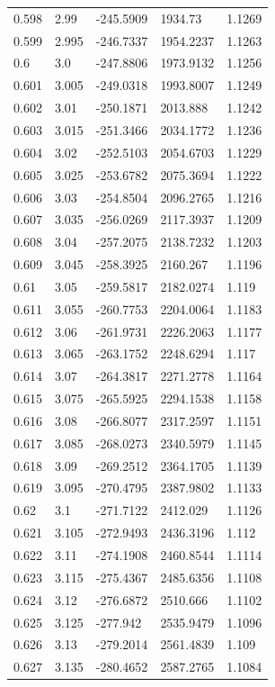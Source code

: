\begin{tabular}{lllll}
0.598 & 2.99 & -245.5909 & 1934.73 & 1.1269 \\
0.599 & 2.995 & -246.7337 & 1954.2237 & 1.1263 \\
0.6 & 3.0 & -247.8806 & 1973.9132 & 1.1256 \\
0.601 & 3.005 & -249.0318 & 1993.8007 & 1.1249 \\
0.602 & 3.01 & -250.1871 & 2013.888 & 1.1242 \\
0.603 & 3.015 & -251.3466 & 2034.1772 & 1.1236 \\
0.604 & 3.02 & -252.5103 & 2054.6703 & 1.1229 \\
0.605 & 3.025 & -253.6782 & 2075.3694 & 1.1222 \\
0.606 & 3.03 & -254.8504 & 2096.2765 & 1.1216 \\
0.607 & 3.035 & -256.0269 & 2117.3937 & 1.1209 \\
0.608 & 3.04 & -257.2075 & 2138.7232 & 1.1203 \\
0.609 & 3.045 & -258.3925 & 2160.267 & 1.1196 \\
0.61 & 3.05 & -259.5817 & 2182.0274 & 1.119 \\
0.611 & 3.055 & -260.7753 & 2204.0064 & 1.1183 \\
0.612 & 3.06 & -261.9731 & 2226.2063 & 1.1177 \\
0.613 & 3.065 & -263.1752 & 2248.6294 & 1.117 \\
0.614 & 3.07 & -264.3817 & 2271.2778 & 1.1164 \\
0.615 & 3.075 & -265.5925 & 2294.1538 & 1.1158 \\
0.616 & 3.08 & -266.8077 & 2317.2597 & 1.1151 \\
0.617 & 3.085 & -268.0273 & 2340.5979 & 1.1145 \\
0.618 & 3.09 & -269.2512 & 2364.1705 & 1.1139 \\
0.619 & 3.095 & -270.4795 & 2387.9802 & 1.1133 \\
0.62 & 3.1 & -271.7122 & 2412.029 & 1.1126 \\
0.621 & 3.105 & -272.9493 & 2436.3196 & 1.112 \\
0.622 & 3.11 & -274.1908 & 2460.8544 & 1.1114 \\
0.623 & 3.115 & -275.4367 & 2485.6356 & 1.1108 \\
0.624 & 3.12 & -276.6872 & 2510.666 & 1.1102 \\
0.625 & 3.125 & -277.942 & 2535.9479 & 1.1096 \\
0.626 & 3.13 & -279.2014 & 2561.4839 & 1.109 \\
0.627 & 3.135 & -280.4652 & 2587.2765 & 1.1084 \\

\end{tabular}
